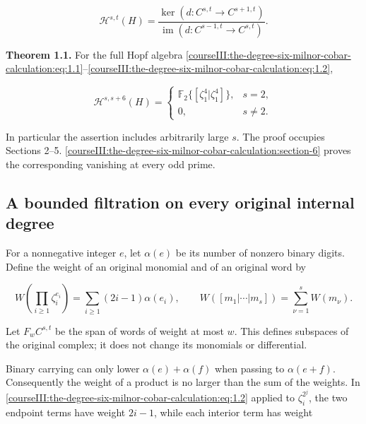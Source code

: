 \begin{equation}
\mathcal H^{s,t}(H)
  =\frac{\ker(d:C^{s,t}\longrightarrow C^{s+1,t})}
         {\operatorname{im}(d:C^{s-1,t}\longrightarrow C^{s,t})}.
 \label{courseIII:the-degree-six-milnor-cobar-calculation:eq:1.7}
\end{equation}

\textbf{Theorem 1.1.} For the full Hopf algebra \eqref{courseIII:the-degree-six-milnor-cobar-calculation:eq:1.1}--\eqref{courseIII:the-degree-six-milnor-cobar-calculation:eq:1.2},

\begin{equation}
\mathcal H^{s,s+6}(H)=
 \begin{cases}
 \mathbb F _2\{[\zeta_1^4|\zeta_1^4]\},&s=2,\\
 0,&s\ne2.
 \end{cases}
 \label{courseIII:the-degree-six-milnor-cobar-calculation:eq:1.8}
\end{equation}

In particular the assertion includes arbitrarily large \(s\). The proof occupies Sections 2--5. \cref{courseIII:the-degree-six-milnor-cobar-calculation:section-6} proves the corresponding vanishing at every odd prime.

\label{courseIII:the-degree-six-milnor-cobar-calculation:six-cobar-finite-filtration}

\subsection{A bounded filtration on every original internal degree}
\label{courseIII:the-degree-six-milnor-cobar-calculation:section-2}

For a nonnegative integer \(e\), let \(\alpha(e)\) be its number of nonzero binary digits. Define the weight of an original monomial and of an original word by

\begin{equation}
W\!\left(\prod_{i\geq1}\zeta_i^{e_i}\right)
    =\sum_{i\geq1}(2i-1)\alpha(e_i),\qquad
 W([m_1|\cdots|m_s])=\sum_{\nu=1}^{s}W(m_\nu).
 \label{courseIII:the-degree-six-milnor-cobar-calculation:eq:2.1}
\end{equation}

Let \(F_wC^{s,t}\) be the span of words of weight at most \(w\). This defines subspaces of the original complex; it does not change its monomials or differential.

Binary carrying can only lower \(\alpha(e)+\alpha(f)\) when passing to \(\alpha(e+f)\). Consequently the weight of a product is no larger than the sum of the weights. In \eqref{courseIII:the-degree-six-milnor-cobar-calculation:eq:1.2} applied to \(\zeta_i^{2^j}\), the two endpoint terms have weight \(2i-1\), while each interior term has weight

